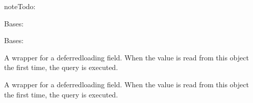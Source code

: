 \documentclass[letterpaper,10pt,english]{sphinxmanual}
\begin{document}
\begin{fulllineitems}
\begin{sphinxadmonition}{note}{\label{\detokenize{models/course:id1}}Todo:}
\begin{itemize}
\end{itemize}
\end{sphinxadmonition}

\begin{fulllineitems}
\label{\detokenize{models/course:api.models.course.Course.DoesNotExist}}
\pysigstartsignatures
{}
\pysigstopsignatures
\sphinxAtStartPar
Bases: 

\end{fulllineitems}


\begin{fulllineitems}
\label{\detokenize{models/course:api.models.course.Course.MultipleObjectsReturned}}
\pysigstartsignatures
{}
\pysigstopsignatures
\sphinxAtStartPar
Bases: 

\end{fulllineitems}


\begin{fulllineitems}
\label{\detokenize{models/course:id0}}
\pysigstartsignatures
{}
\pysigstopsignatures
\sphinxAtStartPar
A wrapper for a deferred\sphinxhyphen{}loading field. When the value is read from this
object the first time, the query is executed.

\end{fulllineitems}


\begin{fulllineitems}
\label{\detokenize{models/course:id2}}
\pysigstartsignatures
{}
\pysigstopsignatures
\sphinxAtStartPar
A wrapper for a deferred\sphinxhyphen{}loading field. When the value is read from this
object the first time, the query is executed.


\end{fulllineitems}
\end{fulllineitems}
\end{document}
